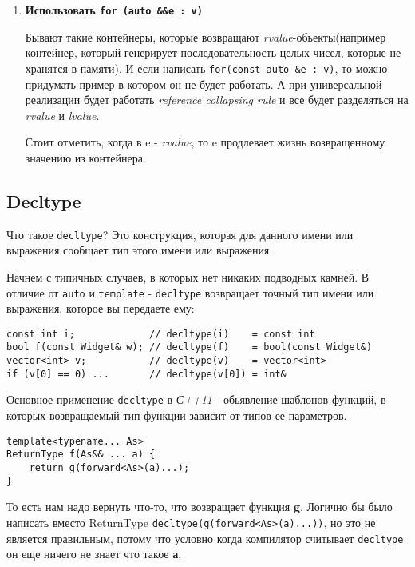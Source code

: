 \begin{enumerate}
		\item \textbf{Использовать \texttt{for (auto &&e : v)}}
		
		Бывают такие контейнеры, которые возвращают \textit{rvalue}-обьекты(например контейнер, который генерирует последовательность целых чисел, которые не хранятся в памяти). И если написать \texttt{for(const auto &e : v)}, то можно придумать пример в котором он не будет работать. А при универсальной реализации будет работать \textit{reference collapsing rule} и все будет разделяться на \textit{rvalue} и \textit{lvalue}.
		
		Стоит отметить, когда в e - \textit{rvalue}, то e продлевает жизнь возвращенному значению из контейнера.
		
	\end{enumerate}

	\subsection {Decltype}
		Что такое \texttt{decltype}? Это конструкция, которая для данного имени или выражения сообщает тип этого имени или выражения
		
		Начнем с типичных случаев, в которых нет никаких подводных камней. В отличие от \texttt{auto} и \texttt{template} - \texttt{decltype} возвращает точный тип имени или выражения, которое вы передаете ему:
		
\begin{verbatim}
const int i;             // decltype(i)    = const int
bool f(const Widget& w); // decltype(f)    = bool(const Widget&)
vector<int> v;           // decltype(v)    = vector<int>
if (v[0] == 0) ...       // decltype(v[0]) = int&
\end{verbatim}
		
		Основное применение \texttt{decltype} в \textit{С++11} - обьявление шаблонов функций, в которых возвращаемый тип функции зависит от типов ее параметров.
\begin{verbatim}		
template<typename... As>
ReturnType f(As&& ... a) {
	return g(forward<As>(a)...);
}
\end{verbatim}
		То есть нам надо вернуть что-то, что возвращает функция \textbf{g}. Логично бы было написать вместо ReturnType \texttt{decltype(g(forward<As>(a)...))}, но это не является правильным, потому что условно когда компилятор считывает \texttt{decltype} он еще ничего не знает что такое \textbf{а}.
		
